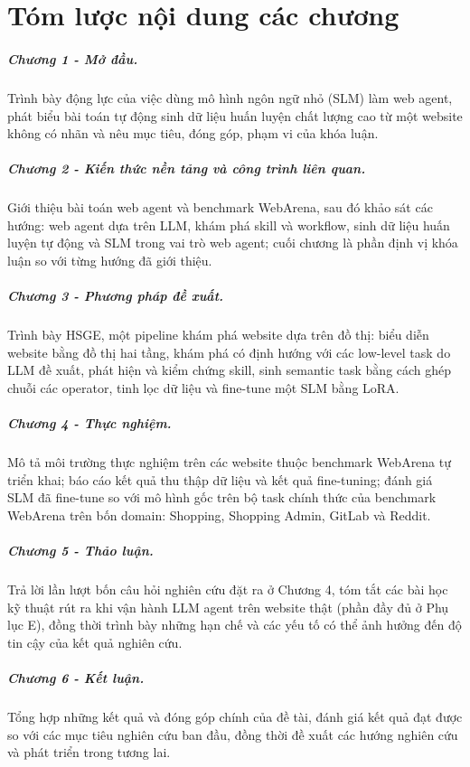 \chapter*{Tóm lược nội dung các chương}

\paragraph{Chương 1 - Mở đầu.} Trình bày động lực của việc dùng mô hình ngôn
ngữ nhỏ (SLM) làm web agent, phát biểu bài toán tự động sinh dữ liệu huấn
luyện chất lượng cao từ một website không có nhãn và nêu mục tiêu, đóng góp,
phạm vi của khóa luận.

\paragraph{Chương 2 - Kiến thức nền tảng và công trình liên quan.} Giới
thiệu bài toán web agent và benchmark WebArena, sau đó khảo sát các hướng:
web agent dựa trên LLM, khám phá skill và workflow, sinh dữ liệu huấn luyện
tự động và SLM trong vai trò web agent; cuối chương là phần định vị khóa luận so với
từng hướng đã giới thiệu.

\paragraph{Chương 3 - Phương pháp đề xuất.} Trình bày HSGE, một pipeline
khám phá website dựa trên đồ thị: biểu diễn website bằng đồ thị hai tầng, khám
phá có định hướng với các low-level task do LLM đề xuất, phát hiện và kiểm
chứng skill, sinh semantic task bằng cách ghép chuỗi các operator, tinh lọc
dữ liệu và fine-tune một SLM bằng LoRA.

\paragraph{Chương 4 - Thực nghiệm.} Mô tả môi trường thực nghiệm trên các
website thuộc benchmark WebArena tự triển khai; báo cáo kết quả thu thập dữ liệu và
kết quả fine-tuning; đánh giá SLM đã fine-tune so với mô hình gốc trên bộ task
chính thức của benchmark WebArena trên bốn domain: Shopping, Shopping Admin, GitLab và Reddit.

\paragraph{Chương 5 - Thảo luận.} Trả lời lần lượt bốn câu hỏi nghiên cứu đặt ra ở Chương 4, tóm tắt các bài học kỹ thuật rút ra khi vận hành LLM agent trên website thật (phần đầy đủ ở Phụ lục E), đồng thời trình bày những hạn chế và các yếu tố có thể ảnh hưởng đến độ tin cậy của kết quả nghiên cứu.

\paragraph{Chương 6 - Kết luận.} Tổng hợp những kết quả và đóng góp chính của đề tài, đánh giá kết quả đạt được so với các mục tiêu nghiên cứu ban đầu, đồng thời đề xuất các hướng nghiên cứu và phát triển trong tương lai.
